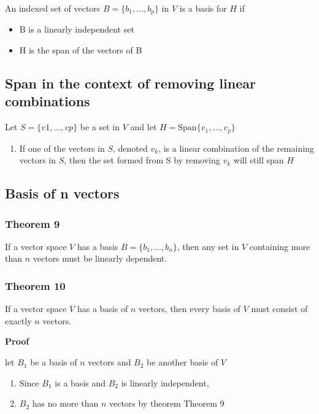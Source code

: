 An indexed set of vectors $B=\{b_{1},\ldots,b_{p}\}$ in $V$ is a basis for $H$ if 


\begin{itemize}
	\item B is a linearly independent set
	\item H is the span of the vectors of B
\end{itemize}


\subsection{Span in the context of removing linear combinations}
Let $S=\{v1, \ldots, vp\}$ be a set in $V$ and let $H=\mbox{Span}\{v_{1},\ldots,v_{p}\}$
	
	\begin{enumerate}
		\item If one of the vectors in $S$, denoted $v_{k}$, is a linear combination of the remaining vectors in $S$, then the set formed from S by removing $v_{k}$ will still span $H$
	\end{enumerate}





  \subsection{Basis of n vectors}
  \subsubsection{Theorem 9}
  
If a vector space $V$ has a basis $B=\{b_{1},\ldots,b_{n}\}$, then any set in $V$ containing more than $n$ vectors must be linearly dependent.

\subsubsection{Theorem 10}
If a vector space $V$ has a basis of $n$ vectors, then every basis of $V$ must consist of exactly $n$ vectors.

\hfill


\textbf{Proof}


let $B_{1}$ be a basis of $n$ vectors and $B_{2}$ be another basis of $V$


\begin{enumerate}
	\item Since $B_{1}$ is a basis and $B_{2}$ is linearly independent,

	\item $B_{2}$ has no more than $n$ vectors by theorem Theorem 9
\end{enumerate}



